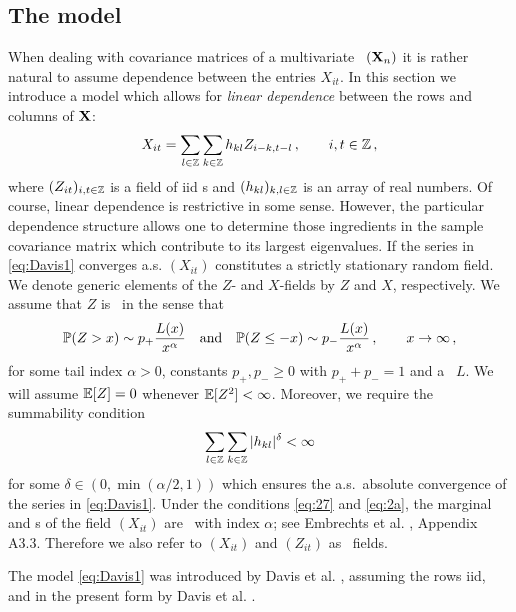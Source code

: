 \subsection{The model}
When dealing with covariance matrices of a multivariate \ts\ $({\mathbf X}_n)$ it is rather natural to assume dependence
between the entries $X_{it}$.
In this section we introduce a model which allows for {\em linear dependence}
between the rows and columns of ${\mathbf X}$:
\begin{equation}\label{eq:Davis1}
X_{it}=\sum_{l\in \mathbb{Z}}\sum_{k\in \mathbb{Z}} h_{kl} Z_{i-k,t-l}\,,\qquad i,t\in\mathbb{Z}\,,
\end{equation}
where $(Z_{it})_{i,t\in \mathbb{Z}}$ is a field of iid \rv s and $(h_{kl})_{k,l\in\mathbb{Z}}$ is an array of real numbers.
Of course, linear dependence is restrictive in some sense. However, the particular dependence structure allows one to
determine those ingredients in the sample covariance matrix which contribute to its largest eigenvalues.
If the series in \eqref{eq:Davis1} converges a.s. $(X_{it})$ constitutes a strictly stationary random field.
We denote generic elements of the $Z$- and $X$-fields by $Z$ and $X$, respectively. We assume that $Z$ is \regvary\ in the sense that
\begin{equation}\label{eq:27}
\mathbb{P}(Z>x)\sim p_+ \dfrac{L(x)}{x^{\alpha}}\quad\mbox{and}\quad  \mathbb{P}(Z\le -x)\sim p_-
\dfrac{L(x)}{x^{\alpha}}\,,\qquad x \to \infty\,,
\end{equation}
for some tail index $\alpha>0$, constants $p_+,p_-\ge 0$ with $p_++p_-=1$ and a \slvary\ $L$. We will assume $\mathbb{E}[ Z]=0$ whenever $\mathbb{E} [Z^2]<\infty$.
Moreover, we require the summability condition
\begin{equation}\label{eq:2a}
\sum_{l \in \mathbb{Z}} \sum_{k\in \mathbb{Z}} |h_{kl}|^{\delta} <\infty
\end{equation}
for some $\delta\in (0,\min({\alpha/2},1))$ which ensures
the a.s.~absolute convergence of the series in \eqref{eq:Davis1}. Under the conditions \eqref{eq:27} and \eqref{eq:2a}, the marginal and
\fidi s of the field $(X_{it})$ are \regvary\ with index $\alpha$; see
Embrechts et al. \cite{embrechts:klueppelberg:mikosch:1997}, Appendix A3.3. Therefore we also refer to $(X_{it})$ and $(Z_{it})$
as \regvary\ fields.
\par
The model \eqref{eq:Davis1} was introduced by Davis et al. \cite{davis:pfaffel:stelzer:2014}, assuming the rows iid, and in the
present form by Davis et al. \cite{davis:mikosch:pfaffel:2015}.
